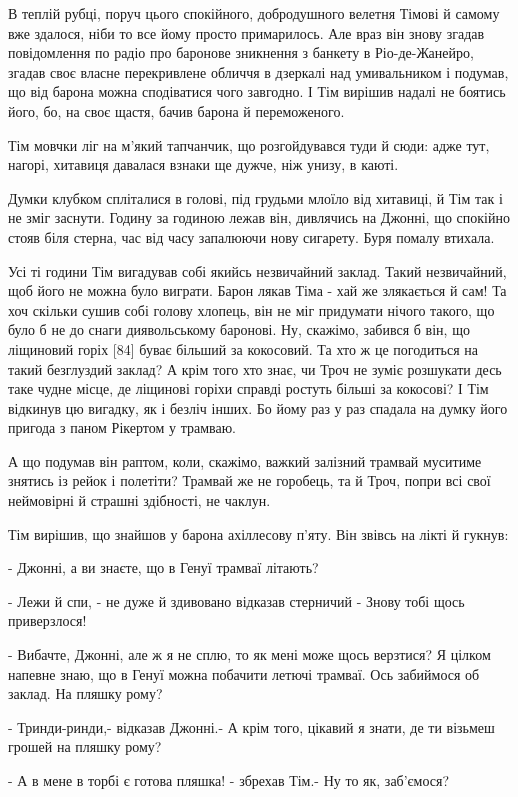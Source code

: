 В теплій рубці, поруч цього спокійного, добродушного велетня Тімові й самому вже здалося, ніби то все йому просто примарилось. Але враз він знову згадав повідомлення по радіо про баронове зникнення з банкету в Ріо-де-Жанейро, згадав своє власне перекривлене обличчя в дзеркалі над умивальником і подумав, що від барона можна сподіватися чого завгодно. І Тім вирішив надалі не боятись його, бо, на своє щастя, бачив барона й переможеного.

Тім мовчки ліг на м'який тапчанчик, що розгойдувався туди й сюди: адже тут, нагорі, хитавиця давалася взнаки ще дужче, ніж унизу, в каюті.

Думки клубком спліталися в голові, під грудьми млоїло від хитавиці, й Тім так і не зміг заснути. Годину за годиною лежав він, дивлячись на Джонні, що спокійно стояв біля стерна, час від часу запалюючи нову сигарету. Буря помалу втихала.

Усі ті години Тім вигадував собі якийсь незвичайний заклад. Такий незвичайний, щоб його не можна було виграти. Барон лякав Тіма - хай же злякається й сам! Та хоч скільки сушив собі голову хлопець, він не міг придумати нічого такого, що було б не до снаги диявольському баронові. Ну, скажімо, забився б він, що ліщиновий горіх [84] буває більший за кокосовий. Та хто ж це погодиться на такий безглуздий заклад? А крім того хто знає, чи Троч не зуміє розшукати десь таке чудне місце, де ліщинові горіхи справді ростуть більші за кокосові? І Тім відкинув цю вигадку, як і безліч інших. Бо йому раз у раз спадала на думку його пригода з паном Рікертом у трамваю.

А що подумав він раптом, коли, скажімо, важкий залізний трамвай муситиме знятись із рейок і полетіти? Трамвай же не горобець, та й Троч, попри всі свої неймовірні й страшні здібності, не чаклун.

Тім вирішив, що знайшов у барона ахіллесову п'яту. Він звівсь на лікті й гукнув:

- Джонні, а ви знаєте, що в Генуї трамваї літають?

- Лежи й спи, - не дуже й здивовано відказав стерничий - Знову тобі щось приверзлося!

- Вибачте, Джонні, але ж я не сплю, то як мені може щось верзтися? Я цілком напевне знаю, що в Генуї можна побачити летючі трамваї. Ось забиймося об заклад. На пляшку рому?

- Тринди-ринди,- відказав Джонні.- А крім того, цікавий я знати, де ти візьмеш грошей на пляшку рому?

- А в мене в торбі є готова пляшка! - збрехав Тім.- Ну то як, заб'ємося?

